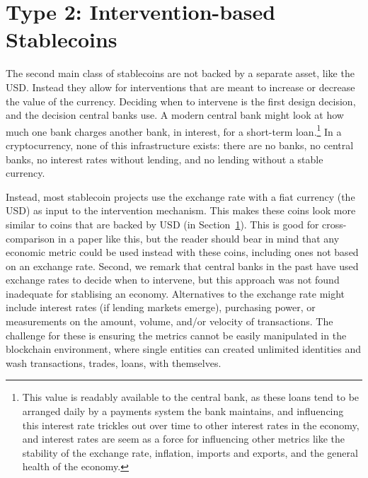 \section{Type 2: Intervention-based Stablecoins}
\label{sec:t2}

The second main class of stablecoins are not backed by a separate asset, like the USD. Instead they allow for interventions that are meant to increase or decrease the value of the currency.  Deciding when to intervene is the first design decision, and the decision central banks use. A modern central bank might look at how much one bank charges another bank, in interest, for a short-term loan.\footnote{This value is readably available to the central bank, as these loans tend to be arranged daily by a payments system the bank maintains, and influencing this interest rate trickles out over time to other interest rates in the economy, and interest rates are seem as a force for influencing other metrics like the stability of the exchange rate, inflation, imports and exports, and the general health of the economy.} In a cryptocurrency, none of this infrastructure exists: there are no banks, no central banks, no interest rates without lending, and no lending without a stable currency.

Instead, most stablecoin projects use the exchange rate with a fiat currency (\eg the USD) as input to the intervention mechanism. This makes these coins look more similar to coins that are backed by USD (in Section~\ref{sec:t2}). This is good for cross-comparison in a paper like this, but the reader should bear in mind that any economic metric could be used instead with these coins, including ones not based on an exchange rate. Second, we remark that central banks in the past have used exchange rates to decide when to intervene, but this approach was not found inadequate for stablising an economy. Alternatives to the exchange rate might include interest rates (if lending markets emerge), purchasing power, or measurements on the amount, volume, and/or velocity of transactions. The challenge for these is ensuring the metrics cannot be easily manipulated in the blockchain environment, where single entities can created unlimited identities and wash transactions, trades, loans, \etc with themselves.  

